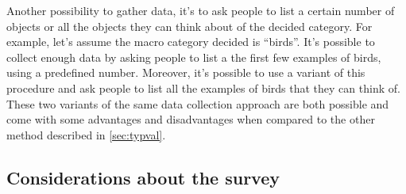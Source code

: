 \documentclass[conference]{IEEEtran}
\begin{document}
			Another possibility to gather data, it's to ask people to list a certain number of objects or all the objects they can think about of the decided category. For example, let's assume the macro category decided 
			is ``birds''. It's possible to collect enough data by asking people to list a the first few examples of birds, using a predefined number. Moreover, it's possible to use a variant of this procedure and ask people 
			to list all the examples of birds that they can think of. These two variants of the same data collection approach are both possible and come with some advantages and disadvantages when compared to the other 
			method described in \ref{sec:typval}. %
		
		\subsection{Considerations about the survey}
		
\end{document}
